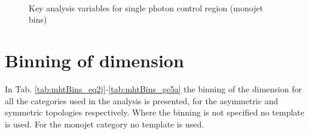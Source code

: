 \begin{figure}
\begin{center}
         \\
        \caption{Key analysis variables for single photon control region (monojet bins)}
        \label{fig:distribution_singlephoton_mono}
    \end{center}
\end{figure}

\clearpage
\section{Binning of \MHT dimension}
\label{app:mhtBinning} 
In Tab. \ref{tab:mhtBins_eq2j}-\ref{tab:mhtBins_ge5a} the binning of
the \mht dimension for all the categories used in the analysis is
presented, for the asymmetric and symmetric topologies respectively.
Where the binning is not specified no template is used.  For the
monojet category no template is used. 

